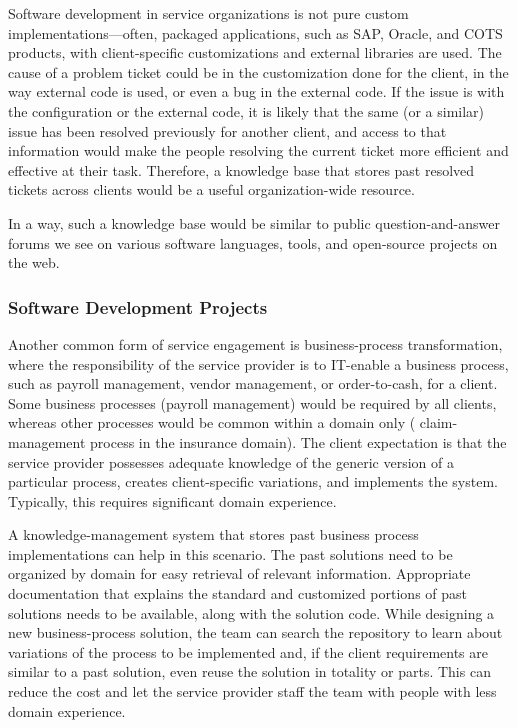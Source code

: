 Software development in service organizations is not pure custom
implementations---often, packaged applications, such as SAP, Oracle, and COTS
products, with client-specific customizations and external libraries are
used. The cause of a problem ticket could be in the customization done for the
client, in the way external code is used, or even a bug in the external code. If
the issue is with the configuration or the external code, it is likely that the
same (or a similar) issue has been resolved previously for another client, and
access to that information would make the people resolving the current ticket
more efficient and effective at their task.  Therefore, a knowledge base that
stores past resolved tickets across clients would be a useful organization-wide
resource.

In a way, such a knowledge base would be similar to public question-and-answer
forums we see on various software languages, tools, and open-source projects on
the web.

\subsubsection{Software Development Projects}

Another common form of service engagement is business-process transformation,
where the responsibility of the service provider is to IT-enable a business
process, such as payroll management, vendor management, or order-to-cash, for a
client. Some business processes (\eg payroll management) would be required by
all clients, whereas other processes would be common within a domain only (\eg
claim-management process in the insurance domain).  The client expectation is
that the service provider possesses adequate knowledge of the generic version of
a particular process, creates client-specific variations, and implements the
system. Typically, this requires significant domain experience.

A knowledge-management system that stores past business process implementations
can help in this scenario. The past solutions need to be organized by domain for
easy retrieval of relevant information. Appropriate documentation that explains
the standard and customized portions of past solutions needs to be available,
along with the solution code. While designing a new business-process solution,
the team can search the repository to learn about variations of the process to
be implemented and, if the client requirements are similar to a past solution,
even reuse the solution in totality or parts. This can reduce the cost and
let the service provider staff the team with people with less domain experience.

